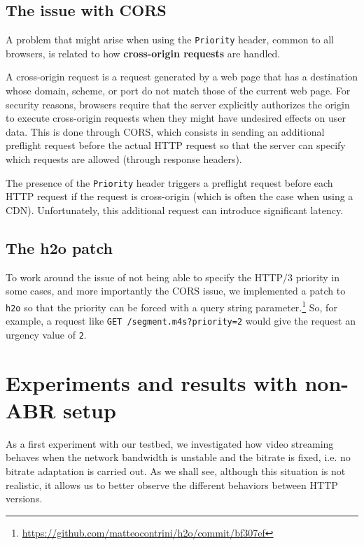 \subsection{The issue with CORS}
\label{sec:eval/browsers/cors}

A problem that might arise when using the \texttt{Priority} header, common to all browsers, is related to how \textbf{cross-origin requests} are handled.

A cross-origin request is a request generated by a web page that has a destination whose domain, scheme, or port do not match those of the current web page. For security reasons, browsers require that the server explicitly authorizes the origin to execute cross-origin requests when they might have undesired effects on user data. This is done through CORS, which consists in sending an additional preflight request before the actual HTTP request so that the server can specify which requests are allowed (through response headers).

The presence of the \texttt{Priority} header triggers a preflight request before each HTTP request if the request is cross-origin (which is often the case when using a CDN). Unfortunately, this additional request can introduce significant latency.

\subsection{The h2o patch}
\label{sec:eval/browsers/patch}

To work around the issue of not being able to specify the HTTP/3 priority in some cases, and more importantly the CORS issue, we implemented a patch to \texttt{h2o} so that the priority can be forced with a query string parameter.\footnote{\url{https://github.com/matteocontrini/h2o/commit/bf307ef}} So, for example, a request like \texttt{GET /segment.m4s?priority=2} would give the request an urgency value of \texttt{2}.

\section{Experiments and results with non-ABR setup}
\label{sec:eval/non-abr}

As a first experiment with our testbed, we investigated how video streaming behaves when the network bandwidth is unstable and the bitrate is fixed, i.e. no bitrate adaptation is carried out. As we shall see, although this situation is not realistic, it allows us to better observe the different behaviors between HTTP versions.

